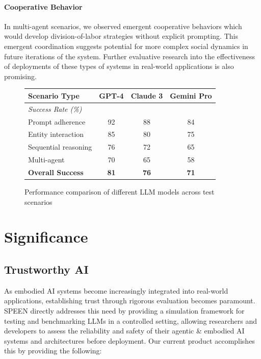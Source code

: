 \documentclass{article}
\begin{document}
\paragraph{Cooperative Behavior} In multi-agent scenarios, we observed emergent cooperative behaviors which would develop division-of-labor strategies without explicit prompting.
This emergent coordination suggests potential for more complex social dynamics in future iterations of the system.
Further evaluative research into the effectiveness of deployments of these types of systems in real-world applications is also promising.
\begin{figure}
    \centering
    \small
    \begin{tabular}{lccc}
        \toprule
        \textbf{Scenario Type} & \textbf{GPT-4} & \textbf{Claude 3} & \textbf{Gemini Pro} \\
        \midrule
        \multicolumn{4}{l}{\textit{Success Rate (\%)}} \\
        Prompt adherence        & 92 & 88 & 84 \\
        Entity interaction      & 85 & 80 & 75 \\
        Sequential reasoning    & 76 & 72 & 65 \\
        Multi-agent             & 70 & 65 & 58 \\
        \midrule
        \textbf{Overall Success} & \textbf{81} & \textbf{76} & \textbf{71} \\
        \bottomrule
    \end{tabular}
    \caption{Performance comparison of different LLM models across test scenarios } 
    \label{tab:model-performance}
\end{figure}

\section{Significance}
\subsection{Trustworthy AI}
As embodied AI systems become increasingly integrated into real-world applications, establishing trust through rigorous evaluation becomes paramount.
SPEEN directly addresses this need by providing a simulation framework for testing and benchmarking LLMs in a controlled setting, allowing researchers and developers to assess the reliability and safety of their agentic \& embodied AI systems and architectures before deployment.
Our current product accomplishes this by providing the following: 
\end{document}
